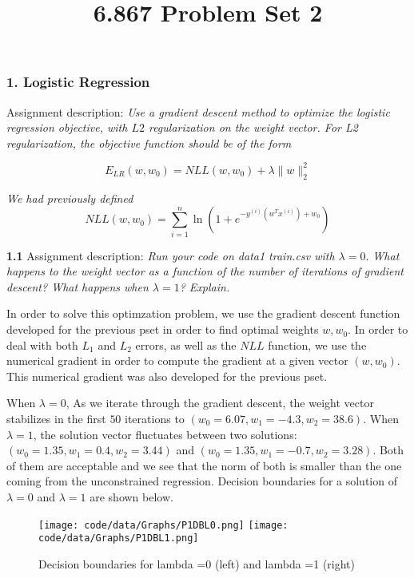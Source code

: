 \documentclass[10pt]{article}
\newcommand{\ds}{\displaystyle}
\begin{document}
	\title{6.867 Problem Set 2}
	\maketitle

\subsubsection*{1. Logistic Regression}

Assignment description: \emph{Use a gradient descent method to optimize the logistic regression objective, with $\ds L2$ regularization on the weight vector. For L2 regularization, the objective function should be of the form }

\emph{$$\ds E_{LR}(w, w_0) = NLL(w, w_0) + \lambda \|w\|_2^2$$}

\emph{We had previously defined $$\ds NLL(w, w_0) = \sum_{i=1}^{n} \ln(1+e^{-y^{(i)}(w^Tx^{(i)}) + w_0}) $$}

\textbf{1.1} Assignment description: \emph{Run your code on data1 train.csv with $\ds\lambda = 0.$ What happens to the weight vector as a function of the number of iterations of gradient descent? What happens when $\ds \lambda = 1$? Explain.}

In order to solve this optimzation problem, we use the gradient descent function developed for the previous pset in order to find optimal weights $\ds w, w_0$. In order to deal with both $\ds L_1$ and $\ds L_2$ errors, as well as the $\ds NLL$ function, we use the numerical gradient in order to compute the gradient at a given vector $\ds (w, w_0)$. This numerical gradient was also developed for the previous pset.

When $\ds \lambda =0$, As we iterate through the gradient descent, the weight vector stabilizes in the first $\ds 50$ iterations to $\ds (w_0 = 6.07, w_1 = -4.3, w_2=38.6)$. When $\ds \lambda=1$, the solution vector fluctuates between two solutions: $\ds (w_0 = 1.35, w_1 = 0.4, w_2=3.44)$ and $\ds (w_0 = 1.35, w_1 = -0.7, w_2=3.28)$. Both of them are acceptable and we see that the norm of both is smaller than the one coming from the unconstrained regression. Decision boundaries for a solution of $\ds \lambda =0$ and $\ds \lambda =1$ are shown below.

\begin{figure}[!ht]
\texttt{[image: code/data/Graphs/P1DBL0.png]}
\texttt{[image: code/data/Graphs/P1DBL1.png]}
\caption{Decision boundaries for lambda =0 (left) and lambda =1 (right)}
\end{figure}
\end{document}
